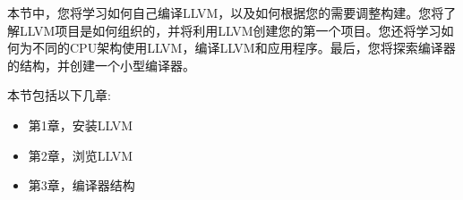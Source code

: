 
\pagecolor{mygray}

本节中，您将学习如何自己编译LLVM，以及如何根据您的需要调整构建。您将了解LLVM项目是如何组织的，并将利用LLVM创建您的第一个项目。您还将学习如何为不同的CPU架构使用LLVM，编译LLVM和应用程序。最后，您将探索编译器的结构，并创建一个小型编译器。\par

本节包括以下几章:\par

\begin{itemize}
	\item 第1章，安装LLVM
	\item 第2章，浏览LLVM
	\item 第3章，编译器结构
\end{itemize}

\newpage

\pagecolor{white}